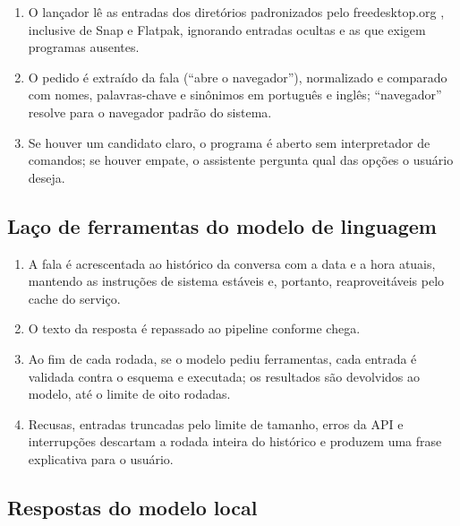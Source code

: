 \begin{enumerate}[label=\arabic*.]
  \item O lançador lê as entradas  dos diretórios padronizados pelo freedesktop.org
        \cite{freedesktop}, inclusive de Snap e Flatpak, ignorando entradas ocultas e as que exigem
        programas ausentes.
  \item O pedido é extraído da fala (“abre o navegador”), normalizado e comparado com nomes, palavras-chave
        e sinônimos em português e inglês; “navegador” resolve para o navegador padrão do sistema.
  \item Se houver um candidato claro, o programa é aberto sem interpretador de comandos; se houver
        empate, o assistente pergunta qual das opções o usuário deseja.
\end{enumerate}

\subsection{Laço de ferramentas do modelo de linguagem}

\begin{enumerate}[label=\arabic*.]
  \item A fala é acrescentada ao histórico da conversa com a data e a hora atuais, mantendo as instruções
        de sistema estáveis e, portanto, reaproveitáveis pelo cache do serviço.
  \item O texto da resposta é repassado ao pipeline conforme chega.
  \item Ao fim de cada rodada, se o modelo pediu ferramentas, cada entrada é validada contra o esquema e
        executada; os resultados são devolvidos ao modelo, até o limite de oito rodadas.
  \item Recusas, entradas truncadas pelo limite de tamanho, erros da API e interrupções descartam a
        rodada inteira do histórico e produzem uma frase explicativa para o usuário.
\end{enumerate}

\subsection{Respostas do modelo local}


